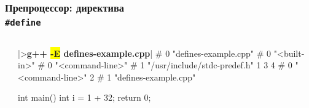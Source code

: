 \documentclass[compress]{beamer}
\newcommand{\shellprompt}{>}
\newcommand{\shellcommand}[1]{\shellprompt \space \textbf{#1}}
\begin{document}
\begin{frame}[fragile]

    \frametitle{Препроцессор: директива \\ \texttt{\#define}}

    \begin{columns}[T]

        \begin{column}{0.5\textwidth}


        \end{column}

        \begin{column}{0.5\textwidth}

            \begin{ConsoleWindow}
|\shellcommand{g++ \colorbox{yellow}{-E} defines-example.cpp}|
# 0 "defines-example.cpp"
# 0 "<built-in>"
# 0 "<command-line>"
# 1 "/usr/include/stdc-predef.h" 1 3 4
# 0 "<command-line>" 2
# 1 "defines-example.cpp"




int main() {
    int i = 1 + 32;
    return 0;
}
            \end{ConsoleWindow}

        \end{column}

    \end{columns}

\end{frame}
\end{document}
